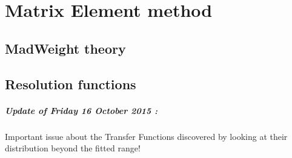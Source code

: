 \chapter{Matrix Element method} \label{ch::MW}

\section{MadWeight theory} \label{sec::MWTheory}

\section{Resolution functions} \label{sec::TF}

\paragraph{Update of Friday 16 October 2015 :} 
Important issue about the Transfer Functions discovered by looking at their distribution beyond the fitted range!
\\

